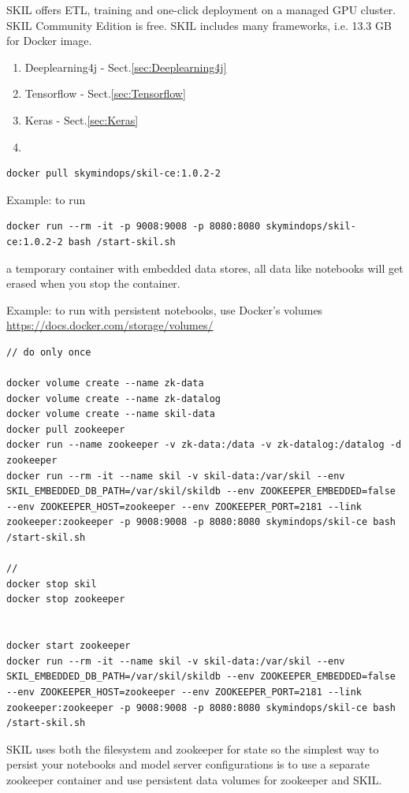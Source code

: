 SKIL offers ETL, training and one-click deployment on a managed GPU cluster.
SKIL Community Edition is free. SKIL includes many frameworks, i.e. 13.3 GB for
Docker image.
\begin{enumerate}
  \item Deeplearning4j - Sect.\ref{sec:Deeplearning4j}
  
  \item Tensorflow - Sect.\ref{sec:Tensorflow}
  
  \item Keras - Sect.\ref{sec:Keras}
  
  \item 
\end{enumerate}


\begin{verbatim}
docker pull skymindops/skil-ce:1.0.2-2
\end{verbatim}

Example: to run
\begin{verbatim}
docker run --rm -it -p 9008:9008 -p 8080:8080 skymindops/skil-ce:1.0.2-2 bash /start-skil.sh
\end{verbatim}
a temporary container with embedded data stores, all data like notebooks will
get erased when you stop the container.

Example: to run with persistent notebooks, use Docker's volumes
\url{https://docs.docker.com/storage/volumes/}
\begin{verbatim}
// do only once

docker volume create --name zk-data
docker volume create --name zk-datalog
docker volume create --name skil-data
docker pull zookeeper
docker run --name zookeeper -v zk-data:/data -v zk-datalog:/datalog -d zookeeper
docker run --rm -it --name skil -v skil-data:/var/skil --env SKIL_EMBEDDED_DB_PATH=/var/skil/skildb --env ZOOKEEPER_EMBEDDED=false --env ZOOKEEPER_HOST=zookeeper --env ZOOKEEPER_PORT=2181 --link zookeeper:zookeeper -p 9008:9008 -p 8080:8080 skymindops/skil-ce bash /start-skil.sh

// 
docker stop skil
docker stop zookeeper


docker start zookeeper
docker run --rm -it --name skil -v skil-data:/var/skil --env SKIL_EMBEDDED_DB_PATH=/var/skil/skildb --env ZOOKEEPER_EMBEDDED=false --env ZOOKEEPER_HOST=zookeeper --env ZOOKEEPER_PORT=2181 --link zookeeper:zookeeper -p 9008:9008 -p 8080:8080 skymindops/skil-ce bash /start-skil.sh
\end{verbatim}
SKIL uses both the filesystem and zookeeper for state so the simplest way to
persist your notebooks and model server configurations is to use a separate
zookeeper container and use persistent data volumes for zookeeper and SKIL.  


